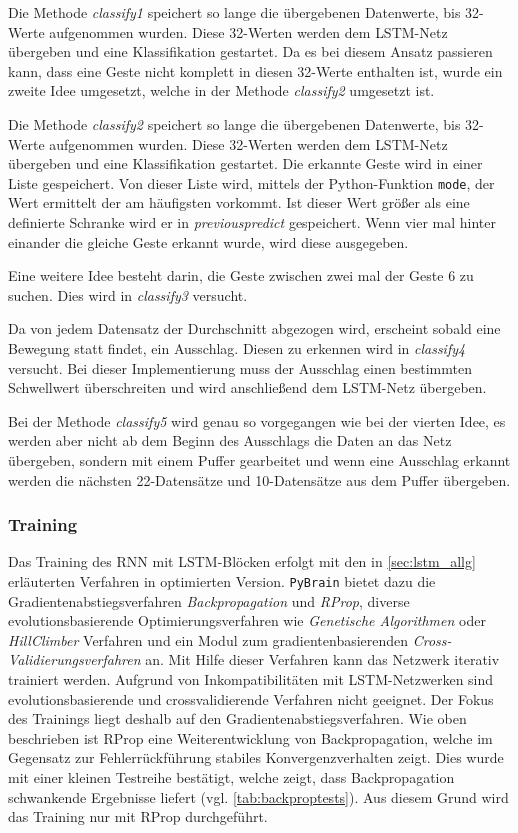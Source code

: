 Die Methode \textit{classify1} speichert so lange die übergebenen Datenwerte, 
bis 32-Werte aufgenommen wurden. Diese 32-Werten werden dem \ac{LSTM}-Netz 
übergeben und eine Klassifikation gestartet. Da es bei diesem Ansatz passieren kann, 
dass eine Geste nicht komplett in diesen 32-Werte enthalten ist, wurde ein zweite 
Idee umgesetzt, welche in der Methode \textit{classify2} umgesetzt ist.

Die Methode \textit{classify2} speichert so lange die übergebenen Datenwerte, 
bis 32-Werte aufgenommen wurden. Diese 32-Werten werden dem \ac{LSTM}-Netz 
übergeben und eine Klassifikation gestartet. Die erkannte Geste wird in einer 
Liste gespeichert. Von dieser Liste wird, mittels der Python-Funktion \texttt{mode}, 
der Wert ermittelt der am häufigsten vorkommt. Ist dieser Wert größer als eine 
definierte Schranke wird er in \textit{previouspredict} gespeichert. Wenn vier 
mal hinter einander die gleiche Geste erkannt wurde, wird diese ausgegeben.

Eine weitere Idee besteht darin, die Geste zwischen zwei mal der Geste 6 zu 
suchen. Dies wird in \textit{classify3} versucht.

Da von jedem Datensatz der Durchschnitt abgezogen wird, erscheint sobald eine 
Bewegung statt findet, ein Ausschlag. Diesen zu erkennen wird in \textit{classify4} 
versucht. Bei dieser Implementierung muss der Ausschlag einen bestimmten Schwellwert 
überschreiten und wird anschließend dem LSTM-Netz übergeben.

Bei der Methode \textit{classify5} wird genau so vorgegangen wie bei der vierten 
Idee, es werden aber nicht ab dem Beginn des Ausschlags die Daten an das 
Netz übergeben, sondern mit einem Puffer gearbeitet und wenn eine Ausschlag erkannt 
werden die nächsten 22-Datensätze und 10-Datensätze aus dem Puffer übergeben.

\subsubsection{Training}
\label{sec:lstm_training}
Das Training des \ac{RNN} mit \ac{LSTM}-Blöcken erfolgt mit den in
\autoref{sec:lstm_allg} erläuterten Verfahren in optimierten Version.
\texttt{PyBrain} bietet dazu die Gradientenabstiegsverfahren
\textit{Backpropagation} und \textit{\ac{RProp}}, diverse evolutionsbasierende
Optimierungsverfahren wie \textit{Genetische Algorithmen} oder
\textit{HillClimber} Verfahren und ein Modul zum gradientenbasierenden
\textit{Cross-Validierungsverfahren} an. Mit Hilfe dieser Verfahren kann das
Netzwerk iterativ trainiert werden. Aufgrund von Inkompatibilitäten mit
\ac{LSTM}-Netzwerken sind evolutionsbasierende und crossvalidierende Verfahren
nicht geeignet. Der Fokus des Trainings liegt deshalb auf den
Gradientenabstiegsverfahren. Wie oben beschrieben ist \ac{RProp} eine
Weiterentwicklung von Backpropagation, welche im Gegensatz zur Fehlerrückführung
stabiles Konvergenzverhalten zeigt. Dies wurde mit einer kleinen Testreihe
bestätigt, welche zeigt, dass Backpropagation schwankende Ergebnisse liefert
(vgl. \autoref{tab:backproptests}). Aus diesem Grund wird das Training nur mit
\ac{RProp} durchgeführt.
 
